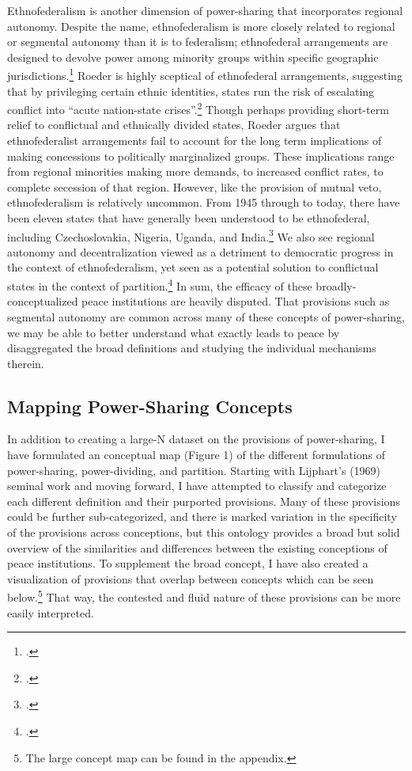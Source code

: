 \documentclass[12pt]{article}
\begin{document}
Ethnofederalism is another dimension of power-sharing that incorporates regional autonomy. Despite the name, ethnofederalism is more closely related to regional or segmental autonomy than it is to federalism; ethnofederal arrangements are designed to devolve power among minority groups within specific geographic jurisdictions.\footcite{roeder_where_2007, roeder_ethnofederalism_2009} Roeder is highly sceptical of ethnofederal arrangements, suggesting that by privileging certain ethnic identities, states run the risk of escalating conflict into ``acute nation-state crises''.\footcite[206]{roeder_ethnofederalism_2009} Though perhaps providing short-term relief to conflictual and ethnically divided states, Roeder argues that ethnofederalist arrangements fail to account for the long term implications of making concessions to politically marginalized groups. These implications range from regional minorities making more demands, to increased conflict rates, to complete secession of that region. However, like the provision of mutual veto, ethnofederalism is relatively uncommon. From 1945 through to today, there have been eleven states that have generally been understood to be ethnofederal, including Czechoslovakia, Nigeria, Uganda, and India.\footcite{lake_policy_1996} We also see regional autonomy and decentralization viewed as a detriment to democratic progress in the context of ethnofederalism, yet seen as a potential solution to conflictual states in the context of partition.\footcite{roeder_sustainable_2003, roeder_where_2007, roeder_ethnofederalism_2009} In sum, the efficacy of these broadly-conceptualized peace institutions are heavily disputed. That provisions such as segmental autonomy are common across many of these concepts of power-sharing, we may be able to better understand what exactly leads to peace by disaggregated the broad definitions and studying the individual mechanisms therein. 

\subsection{Mapping Power-Sharing Concepts}
In addition to creating a large-N dataset on the provisions of power-sharing, I have formulated an conceptual map (Figure 1) of the different formulations of power-sharing, power-dividing, and partition. Starting with Lijphart’s (1969) seminal work and moving forward, I have attempted to classify and categorize each different definition and their purported provisions. Many of these provisions could be further sub-categorized, and there is marked variation in the specificity of the provisions across conceptions, but this ontology provides a broad but solid overview of the similarities and differences between the existing conceptions of peace institutions. To supplement the broad concept, I have also created a visualization of provisions that overlap between concepts which can be seen below.\footnote{The large concept map can be found in the appendix.} That way, the contested and fluid nature of these provisions can be more easily interpreted.  
\end{document}
